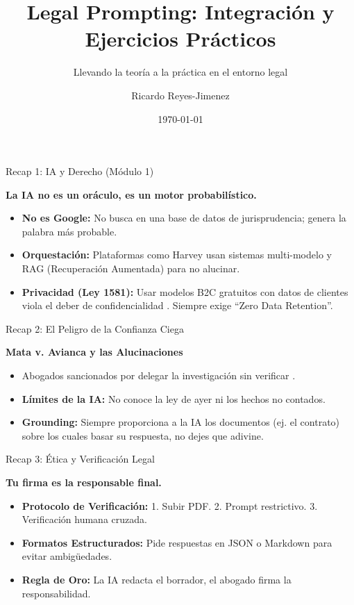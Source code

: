\documentclass[aspectratio=169]{beamer}
\title[ Legal Prompting]{ Legal Prompting: Integración y Ejercicios Prácticos}
\subtitle{ Llevando la teoría a la práctica en el entorno legal}
\author{Ricardo Reyes-Jimenez}
\institute{Universidad de La Sabana}
\date{\today}
\begin{document}
\begin{frame}
  \titlepage
\end{frame}

\usebackgroundtemplate{}



\begin{frame}[fragile]{Recap 1: IA y Derecho (Módulo 1)}


\textbf{La IA no es un oráculo, es un motor probabilístico.}

\begin{itemize}
  \item \textbf{No es Google:} No busca en una base de datos de jurisprudencia; genera la palabra más probable.
  \item \textbf{Orquestación:} Plataformas como Harvey usan sistemas multi-modelo y RAG (Recuperación Aumentada) para no alucinar.
  \item \textbf{Privacidad (Ley 1581):} Usar modelos B2C gratuitos con datos de clientes viola el deber de confidencialidad \cite{ley1581}. Siempre exige ``Zero Data Retention''.
\end{itemize}
\end{frame}



\begin{frame}[fragile]{Recap 2: El Peligro de la Confianza Ciega}


\textbf{Mata v. Avianca y las Alucinaciones}

\begin{itemize}
  \item Abogados sancionados por delegar la investigación sin verificar \cite{matavavianca}.
  \item \textbf{Límites de la IA:} No conoce la ley de ayer ni los hechos no contados.
  \item \textbf{Grounding:} Siempre proporciona a la IA los documentos (ej. el contrato) sobre los cuales basar su respuesta, no dejes que adivine.
\end{itemize}
\end{frame}



\begin{frame}[fragile]{Recap 3: Ética y Verificación Legal}


\textbf{Tu firma es la responsable final.}

\begin{itemize}
  \item \textbf{Protocolo de Verificación:} 1. Subir PDF. 2. Prompt restrictivo. 3. Verificación humana cruzada.
  \item \textbf{Formatos Estructurados:} Pide respuestas en JSON o Markdown para evitar ambigüedades.
  \item \textbf{Regla de Oro:} La IA redacta el borrador, el abogado firma la responsabilidad.
\end{itemize}
\end{frame}
\end{document}
